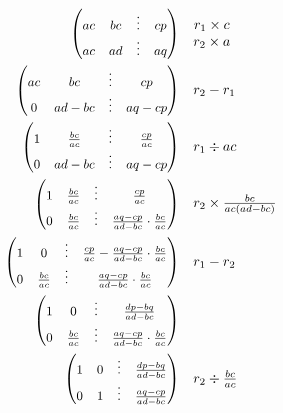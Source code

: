 \documentclass[../main]{subfiles}
\begin{document}
\begin{align*}
    {\small\begin{pmatrix}{}ac&bc&\vdots&cp\\ac&ad&\vdots&aq\end{pmatrix}} &
    \quad \begin{matrix}
        r_1\times c\\r_2\times a
    \end{matrix} \\
    {\small\begin{pmatrix}{}ac&bc&\vdots&cp\\0&ad-bc&\vdots&aq-cp\end{pmatrix}} &
    \quad \begin{matrix}
        r_2-r_1
    \end{matrix} \\
    {\small\begin{pmatrix}{}1&\frac{bc}{ac}&\vdots&\frac{cp}{ac}\\0&ad-bc&\vdots&aq-cp\end{pmatrix}} &
    \quad \begin{matrix}
        r_1\div ac
    \end{matrix} \\
    {\small\begin{pmatrix}{}1&\frac{bc}{ac}&\vdots&\frac{cp}{ac}\\0&\frac{bc}{ac}&\vdots&\frac{aq-cp}{ad-bc}\cdot\frac{bc}{ac}\end{pmatrix}} &
    \quad \begin{matrix}
        r_2\times \frac{bc}{ac(ad-bc)}
    \end{matrix} \\
    {\small\begin{pmatrix}{}1&0&\vdots&\frac{cp}{ac}-\frac{aq-cp}{ad-bc}\cdot\frac{bc}{ac}\\0&\frac{bc}{ac}&\vdots&\frac{aq-cp}{ad-bc}\cdot\frac{bc}{ac}\end{pmatrix}} &
    \quad \begin{matrix}
        r_1-r_2
    \end{matrix} \\
    {\small\begin{pmatrix}{}1&0&\vdots&\frac{dp-bq}{ad-bc}\\0&\frac{bc}{ac}&\vdots&\frac{aq-cp}{ad-bc}\cdot\frac{bc}{ac}\end{pmatrix}} &
    \quad \begin{matrix}
    \end{matrix} \\
    {\small\begin{pmatrix}{}1&0&\vdots&\frac{dp-bq}{ad-bc}\\0&1&\vdots&\frac{aq-cp}{ad-bc}\end{pmatrix}} &
    \quad \begin{matrix}
        r_2\div \frac{bc}{ac}
    \end{matrix}
\end{align*}
\end{document}
